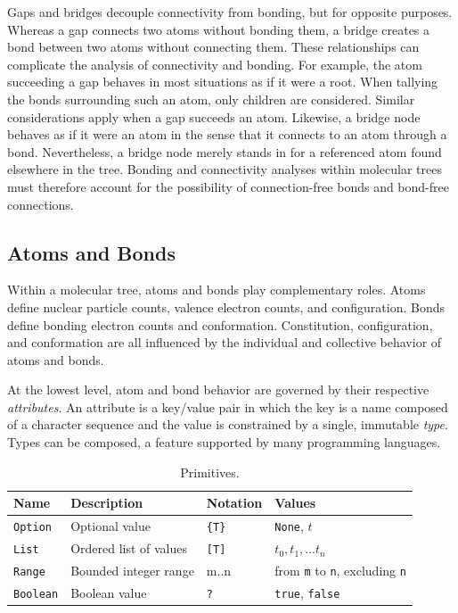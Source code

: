 \documentclass{article}
\def\ttt{\texttt}
\begin{document}
Gaps and bridges decouple connectivity from bonding, but for opposite purposes. Whereas a gap connects two atoms without bonding them, a bridge creates a bond between two atoms without connecting them. These relationships can complicate the analysis of connectivity and bonding. For example, the atom succeeding a gap behaves in most situations as if it were a root. When tallying the bonds surrounding such an atom, only children are considered. Similar considerations apply when a gap succeeds an atom. Likewise, a bridge node behaves as if it were an atom in the sense that it connects to an atom through a bond. Nevertheless, a bridge node merely stands in for a referenced atom found elsewhere in the tree. Bonding and connectivity analyses within molecular trees must therefore account for the possibility of connection-free bonds and bond-free connections. 

\subsection*{Atoms and Bonds}
\label{atoms-and-bonds}

Within a molecular tree, atoms and bonds play complementary roles. Atoms define nuclear particle counts, valence electron counts, and configuration. Bonds define bonding electron counts and conformation. Constitution, configuration, and conformation are all influenced by the individual and collective behavior of atoms and bonds.

At the lowest level, atom and bond behavior are governed by their respective \textit{attributes}. An attribute is a key/value pair in which the key is a name composed of a character sequence and the value is constrained by a single, immutable \textit{type}. Types can be composed, a feature supported by many programming languages.

\begin{table}
\begin{minipage}{\textwidth}
\renewcommand*\footnoterule{}
\caption{Primitives.}
\label{table:primitives}
\centering
\begin{tabular}{l l l l}
    \hline
    Name & Description & Notation & Values \\
    \hline
    \ttt{Option} & Optional value & \ttt{\{T\}} & \ttt{None}, $t$ \\
    \ttt{List} & Ordered list of values & \ttt{[T]} & $t_0, t_1, ... t_n$ \\
    \ttt{Range} & Bounded integer range & m..n & from \ttt{m} to \ttt{n}, excluding \ttt{n} \\
    \ttt{Boolean} & Boolean value & \ttt{?} & \ttt{true}, \ttt{false} \\
    \hline
\end{tabular}
\end{minipage}
\end{table}
\end{document}
